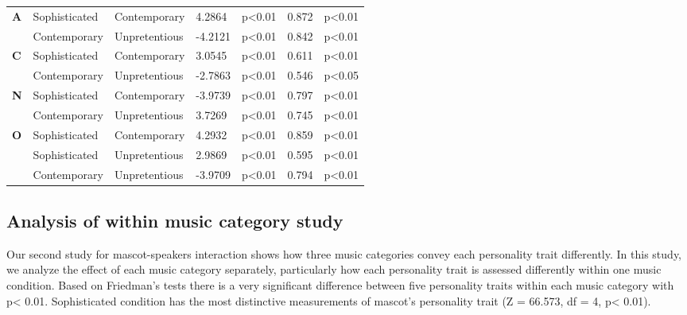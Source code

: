 \begin{longtable}{ |p{0.3cm}| p{2.4cm}|p{2.4cm}|p{1.2cm}| p{1.7cm}|p{1cm}|p{1.7cm}|  }
\hline 
\hline 
\multirow{2}{*}{\textbf{A}}  
&Sophisticated		&Contemporary			&4.2864			&p<0.01		&0.872 	&p<0.01\\
&Contemporary		&Unpretentious			&-4.2121			&p<0.01		&0.842 	&p<0.01\\
\hline 
\hline 
\multirow{2}{*}{\textbf{C}} 
&Sophisticated		&Contemporary			&3.0545			&p<0.01		&0.611 		&p<0.01\\
&Contemporary		&Unpretentious			&-2.7863			& p<0.01		& 0.546 		&p<0.05\\
\hline 
\hline 
\multirow{2}{*}{\textbf{N}} 
&Sophisticated		&Contemporary			&-3.9739			&p<0.01		& 0.797		&p<0.01\\
&Contemporary		&Unpretentious			&3.7269			&p<0.01		&0.745 		&p<0.01\\
\hline 
\hline 
\multirow{3}{*}{\textbf{O}} 
&Sophisticated		&Contemporary			&4.2932			&p<0.01		& 0.859 		&p<0.01\\
&Sophisticated		&Unpretentious			&2.9869			&p<0.01		& 0.595 		&p<0.01\\
&Contemporary		&Unpretentious			&-3.9709			&p<0.01		& 0.794  		&p<0.01\\
\hline 
\end{longtable}

\subsection{Analysis of within music category study}
\label{Study2(M-S)}
Our second study for mascot-speakers interaction shows how three music categories convey each personality trait differently. In this study, we analyze the effect of each music category separately, particularly how each personality trait is assessed differently within one music condition. Based on Friedman’s tests there is a very significant difference between five personality traits within each music category with p< 0.01. Sophisticated condition has the most distinctive measurements of mascot’s personality trait (Z = 66.573, df = 4, p< 0.01).


